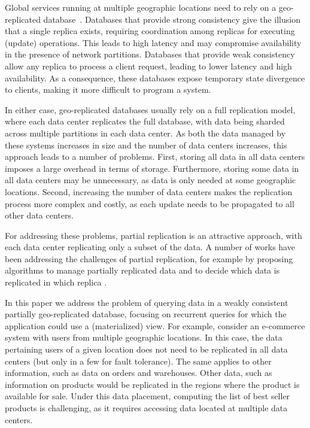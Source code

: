 \documentclass[sigconf, nonacm]{acmart}
\begin{document}

Global services running at multiple geographic locations need 
to rely on a geo-replicated database~\cite{dynamo}.
Databases \cite{spanner,cockroachdb,mdcc} that provide strong consistency give the illusion that 
a single replica exists, requiring coordination among
replicas for executing (update) operations. This leads to high latency and may compromise 
availability in the presence of network partitions.
Databases that provide weak consistency \cite{eventual,dynamo,cops} allow any replica to process a
client request, leading to lower latency and high availability. As a consequence, these databases expose
temporary state divergence to clients, making it more difficult to program a system. 

In either case, geo-replicated databases usually rely on a full replication model, where each data 
center replicates the full database, with data being sharded across multiple partitions in each data 
center. 
As both the data managed by these systems increases in size and the number of data centers increases,
this approach leads to a number of problems.
First, storing all data in all data centers imposes a large overhead in terms of storage. 
Furthermore, storing some data in all data centers may be unnecessary, as data is only needed at some
geographic locations.
Second, increasing the number of data centers makes the replication process more complex and costly, 
as each update needs to be propagated to all other data centers.

For addressing these problems, partial replication is an attractive approach, with each data center
replicating only a subset of the data.
A number of works have been addressing the challenges of 
partial replication, for example by proposing algorithms to manage partially replicated data \cite{spanner,saturn,sipre, practi} and to decide which data is replicated in which replica \cite{slog, sipre}.

In this paper we address the problem of querying data in a weakly consistent partially geo-replicated database, 
focusing on recurrent queries for which the application could use a (materialized) view.
For example, consider an e-commerce system with users from multiple geographic locations.
In this case, the data pertaining users of a given location does not need to be replicated in all data centers
(but only in a few for fault tolerance). The same applies to other information, such as data on orders and 
warehouses.
Other data, such as information on products would be replicated in the regions where the product
is available for sale.  
Under this data placement, computing the list of best seller products is challenging, as it requires
accessing data located at multiple data centers.
\end{document}
